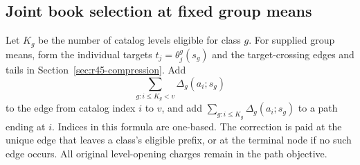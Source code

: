 \subsection{Joint book selection at fixed group means}
Let $K_g$ be the number of catalog levels eligible for class $g$. For supplied group means, form the individual targets $t_j=\theta_j^g(s_g)$ and the target-crossing edges and tails in Section~\ref{sec:r45-compression}. Add
\begin{equation}\label{eq:r49-edge-delta}
 \sum_{g:i\leq K_g<v}\Delta_g(a_i;s_g)
\end{equation}
to the edge from catalog index $i$ to $v$, and add $\sum_{g:i\leq K_g}\Delta_g(a_i;s_g)$ to a path ending at $i$. Indices in this formula are one-based. The correction is paid at the unique edge that leaves a class's eligible prefix, or at the terminal node if no such edge occurs. All original level-opening charges remain in the path objective.

